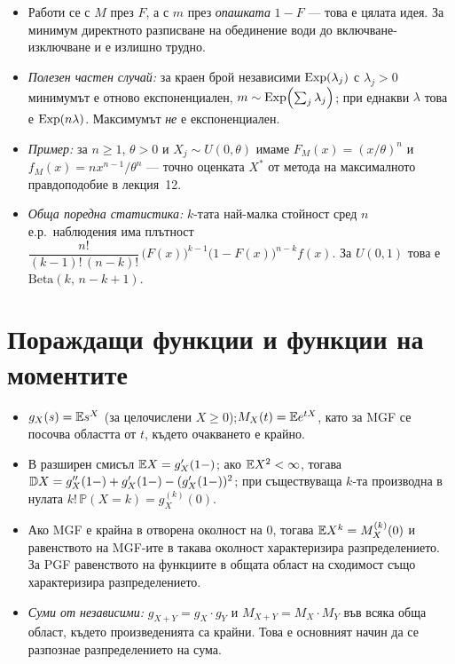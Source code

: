 \begin{itemize}\itemsep2pt
  \item Работи се с $M$ през $F$, а с $m$ през \emph{опашката} $1-F$ — това е цялата идея.
        За минимум директното разписване на обединение води до включване-изключване и е
        излишно трудно.
  \item \emph{Полезен частен случай:} за краен брой независими
        $\operatorname{Exp}(\lambda_j)$ с $\lambda_j>0$ минимумът е
        отново експоненциален, $m \sim \operatorname{Exp}\!\left(\sum_j \lambda_j\right)$; при
        еднакви $\lambda$ това е $\operatorname{Exp}(n\lambda)$. Максимумът \emph{не} е
        експоненциален.
  \item \emph{Пример:} за $n\ge1$, $\theta>0$ и $X_j \sim U(0,\theta)$ имаме
        $F_M(x) = (x/\theta)^n$ и
        $f_M(x) = n x^{n-1}/\theta^n$ — точно оценката $X^*$ от метода на максималното
        правдоподобие в лекция~12.
  \item \emph{Обща поредна статистика:} $k$-тата най-малка стойност сред $n$ е.р.\ наблюдения има
        плътност
        $\dfrac{n!}{(k-1)!\,(n-k)!}\,\big(F(x)\big)^{k-1}\big(1-F(x)\big)^{n-k} f(x)$.
        За $U(0,1)$ това е $\text{Beta}(k,\,n-k+1)$.
\end{itemize}

\section{Пораждащи функции и функции на моментите}

\begin{itemize}\itemsep2pt
  \item $g_X(s) = \mathbb{E} s^X$ (за целочислени $X \ge 0$);\quad $M_X(t) = \mathbb{E} e^{tX}$,
        като за MGF се посочва областта от $t$, където очакването е крайно.
  \item В разширен смисъл $\mathbb{E} X=g_X'(1-)$; ако $\mathbb{E} X^2<\infty$, тогава
        $\mathbb{D} X = g_X''(1-) + g_X'(1-) - (g_X'(1-))^2$;\quad
        при съществуваща $k$-та производна в нулата
        $k!\,\mathbb{P}(X=k) = g_X^{(k)}(0)$.
  \item Ако MGF е крайна в отворена околност на $0$, тогава
        $\mathbb{E} X^k = M_X^{(k)}(0)$ и равенството на MGF-ите в такава околност
        характеризира разпределението. За PGF равенството на функциите в
        общата област на сходимост също характеризира разпределението.
  \item \emph{Суми от независими:} $g_{X+Y} = g_X \cdot g_Y$ и
        $M_{X+Y} = M_X \cdot M_Y$ във всяка обща област, където произведенията
        са крайни.
        Това е основният начин да се разпознае разпределението на сума.
\end{itemize}

